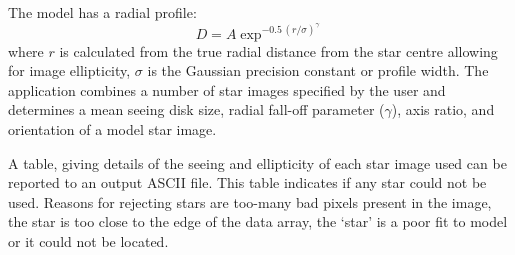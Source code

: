{{{      The model has a radial profile:
      {\Large
      \[   D =  A \exp^{-0.5\,(r/\sigma)^{\gamma}} \]
      }
      where $r$ is calculated from the true radial distance from the star
      centre allowing for image ellipticity, $\sigma$ is the Gaussian
      precision constant or profile width.  The application combines a
      number of star images specified by the user and determines a mean
      seeing disk size, radial fall-off parameter ($\gamma$), axis ratio,
      and orientation of a model star image.

      A table, giving details of the seeing and ellipticity of each
      star image used can be reported to an output ASCII file.  This
      table indicates if any star could not be used.  Reasons for
      rejecting stars are too-many bad pixels present in the image,
      the star is too close to the edge of the data array, the
      `star' is a poor fit to model or it could not be located.

}}}

